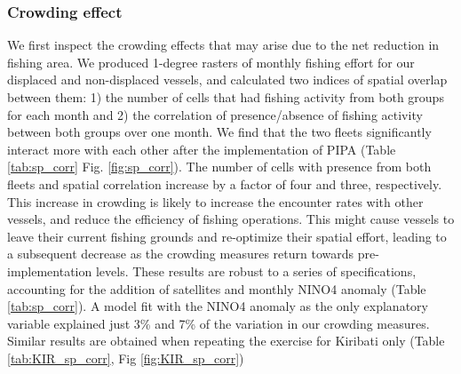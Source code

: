 \documentclass[9p,twocolumn,twoside,lineno]{pnas-new}
\begin{document}
\subsubsection{Crowding effect}

We first inspect the crowding effects that may arise due to the net reduction in fishing area. We produced 1-degree rasters of monthly fishing effort for our displaced and non-displaced vessels, and calculated two indices of spatial overlap between them: 1) the number of cells that had fishing activity from both groups for each month and 2) the correlation of presence/absence of fishing activity between both groups over one month. We find that the two fleets significantly interact more with each other after the implementation of PIPA (Table \ref{tab:sp_corr} Fig. \ref{fig:sp_corr}). The number of cells with presence from both fleets and spatial correlation increase by a factor of four and three, respectively. This increase in crowding is likely to increase the encounter rates with other vessels, and reduce the efficiency of fishing operations. This might cause vessels to leave their current fishing grounds and re-optimize their spatial effort, leading to a subsequent decrease as the crowding measures return towards pre-implementation levels. These results are robust to a series of specifications, accounting for the addition of satellites and monthly NINO4 anomaly (Table \ref{tab:sp_corr}). A model fit with the NINO4 anomaly as the only explanatory variable explained just 3\% and 7\% of the variation in our crowding measures. Similar results are obtained when repeating the exercise for Kiribati only (Table \ref{tab:KIR_sp_corr}, Fig \ref{fig:KIR_sp_corr})
\end{document}

